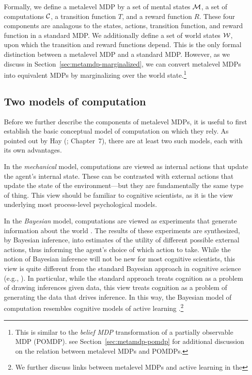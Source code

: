 Formally, we define a metalevel MDP by a set of mental states $\mathcal{M}$, a set of computations $\mathcal{C}$, a transition function $T$, and a reward function $R$. These four components are analagous to the states, actions, transition function, and reward function in a standard MDP. We additionally define a set of world states $\mathcal{W}$, upon which the transition and reward functions depend. This is the only formal distinction between a metalevel MDP and a standard MDP. However, as we discuss in Section~\ref{sec:metamdp-marginalized}, we can convert metalevel MDPs into equivalent MDPs by marginalizing over the world state.\footnote{This is similar to the \emph{belief MDP} transformation of a partially observable MDP (POMDP). see Section~\ref{sec:metamdp-pomdp} for additional discussion on the relation between metalevel MDPs and POMDPs.}


\subsection{Two models of computation}

Before we further describe the components of metalevel MDPs, it is useful to first establish the basic conceptual model of computation on which they rely. As pointed out by Hay (\citeyear{hay2016principles}; Chapter~7), there are at least two such models, each with its own advantages.

In the \emph{mechanical} model, computations are viewed as internal actions that update the agent's internal state. These can be contrasted with external actions that update the state of the environment---but they are fundamentally the same type of thing. This view should be familiar to cognitive scientists, as it is the view underlying most process-level psychological models.

In the \emph{Bayesian} model, computations are viewed as experiments that generate information about the world \citep{matheson1968economic}. The results of these experiments are synthesized, by Bayesian inference, into estimates of the utility of different possible external actions, thus informing the agent's choice of which action to take. While the notion of Bayesian inference will not be new for most cognitive scientists, this view is quite different from the standard Bayesian approach in cognitive science (e.g., \citealp{tenenbaum2011how}). In particular, while the standard approach treats cognition as a problem of drawing inferences given data, this view treats cognition as a problem of generating the data that drives inference. In this way, the Bayesian model of computation resembles cognitive models of active learning \citep{gureckis2012selfdirected,gottlieb2013informationseeking}.\footnote{We further discuss links between metalevel MDPs and active learning in the }

